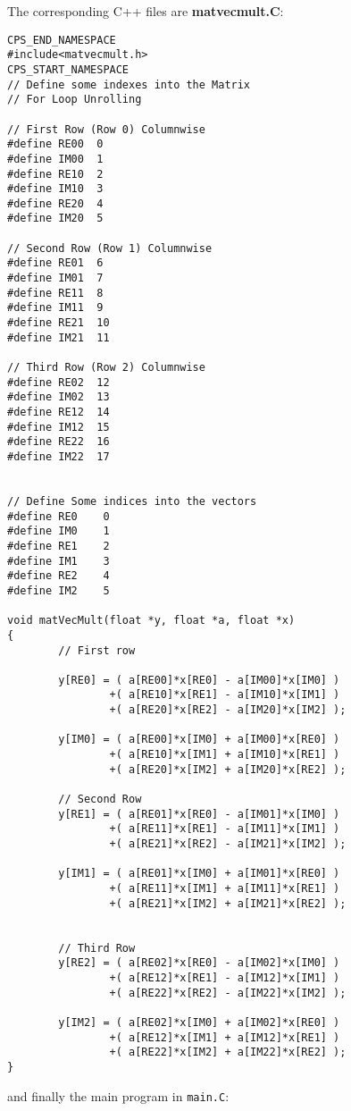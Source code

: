 The corresponding C++ files are {\bf matvecmult.C}:
{\scriptsize
\begin{verbatim}
CPS_END_NAMESPACE
#include<matvecmult.h>
CPS_START_NAMESPACE
// Define some indexes into the Matrix
// For Loop Unrolling

// First Row (Row 0) Columnwise
#define RE00  0
#define IM00  1
#define RE10  2
#define IM10  3
#define RE20  4
#define IM20  5

// Second Row (Row 1) Columnwise
#define RE01  6
#define IM01  7
#define RE11  8
#define IM11  9 
#define RE21  10
#define IM21  11

// Third Row (Row 2) Columnwise
#define RE02  12
#define IM02  13
#define RE12  14
#define IM12  15
#define RE22  16
#define IM22  17


// Define Some indices into the vectors
#define RE0    0
#define IM0    1
#define RE1    2
#define IM1    3
#define RE2    4
#define IM2    5

void matVecMult(float *y, float *a, float *x)
{
        // First row

        y[RE0] = ( a[RE00]*x[RE0] - a[IM00]*x[IM0] )
                +( a[RE10]*x[RE1] - a[IM10]*x[IM1] )
                +( a[RE20]*x[RE2] - a[IM20]*x[IM2] );

        y[IM0] = ( a[RE00]*x[IM0] + a[IM00]*x[RE0] )
                +( a[RE10]*x[IM1] + a[IM10]*x[RE1] )
                +( a[RE20]*x[IM2] + a[IM20]*x[RE2] );

        // Second Row
        y[RE1] = ( a[RE01]*x[RE0] - a[IM01]*x[IM0] )
                +( a[RE11]*x[RE1] - a[IM11]*x[IM1] )
                +( a[RE21]*x[RE2] - a[IM21]*x[IM2] );

        y[IM1] = ( a[RE01]*x[IM0] + a[IM01]*x[RE0] )
                +( a[RE11]*x[IM1] + a[IM11]*x[RE1] )
                +( a[RE21]*x[IM2] + a[IM21]*x[RE2] );


        // Third Row
        y[RE2] = ( a[RE02]*x[RE0] - a[IM02]*x[IM0] )
                +( a[RE12]*x[RE1] - a[IM12]*x[IM1] )
                +( a[RE22]*x[RE2] - a[IM22]*x[IM2] );

        y[IM2] = ( a[RE02]*x[IM0] + a[IM02]*x[RE0] )
                +( a[RE12]*x[IM1] + a[IM12]*x[RE1] )
                +( a[RE22]*x[IM2] + a[IM22]*x[RE2] );
}
\end{verbatim}}
and finally the main program in {\tt main.C}:
